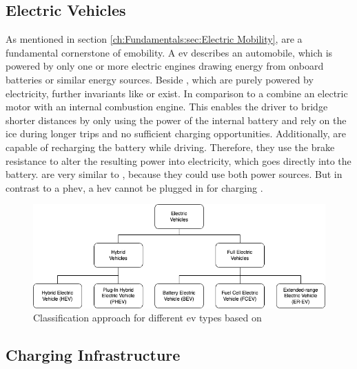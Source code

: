 \subsection{Electric Vehicles}
\label{ch:Fundamentals:sec:Electric Mobility:Electric Vehicles}

As mentioned in section \ref{ch:Fundamentals:sec:Electric Mobility},  are a fundamental cornerstone of \Gls{emobility}. A \acrshort{ev} describes an automobile, which is powered by only one or more electric engines drawing energy from onboard batteries or similar energy sources. 
Beside , which are purely powered by electricity, further invariants like  or  exist. In comparison to  a  combine an electric motor with an internal combustion engine.
This enables the driver to bridge shorter distances by only using the power of the internal battery and rely on the \acrshort{ice} during longer trips and no sufficient charging opportunities. Additionally,  are capable of recharging the battery while driving.
Therefore, they use the brake resistance to alter the resulting power into electricity, which goes directly into the battery.
 are very similar to , because they could use both power sources. But in contrast to a \acrshort{phev}, a \acrshort{hev} cannot be plugged in for charging \cite{kathiresh_e-mobility_2022}.

\begin{figure}[!ht]
    \centering
    \includegraphics[scale=0.4]{resources/images/main/1_fundamentals/ElectricVehicleTypes.png}
    \caption{Classification approach for different \acrshort{ev} types based on \cite{acharige_review_2023}}
    \label{fig:ev-classification}
\end{figure}

\subsection{Charging Infrastructure}
\label{ch:Fundamentals:sec:Electric Mobility:ssec:Charging Infrastructure}


